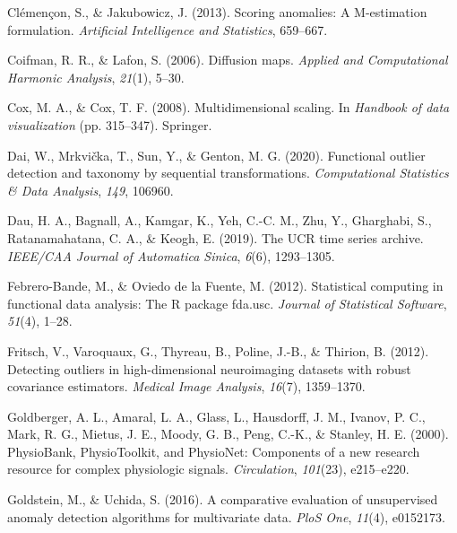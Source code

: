 \documentclass[
  10pt]{article}
\newlength{\cslhangindent}
\newlength{\cslentryspacingunit} %
\newenvironment{CSLReferences}[2] %
 {%
  \setlength{\parindent}{0pt}
  \ifodd #1
  \let\oldpar\par
  \def\par{\hangindent=\cslhangindent\oldpar}
  \fi
  \setlength{\parskip}{#2\cslentryspacingunit}
 }%
 {}
\begin{document}
\begin{CSLReferences}{1}{0}
\leavevmode{}%
Clémençon, S., \& Jakubowicz, J. (2013). Scoring anomalies: A {M}-estimation formulation. \emph{Artificial Intelligence and Statistics}, 659--667.

\leavevmode{}%
Coifman, R. R., \& Lafon, S. (2006). Diffusion maps. \emph{Applied and Computational Harmonic Analysis}, \emph{21}(1), 5--30.

\leavevmode{}%
Cox, M. A., \& Cox, T. F. (2008). Multidimensional scaling. In \emph{Handbook of data visualization} (pp. 315--347). Springer.

\leavevmode{}%
Dai, W., Mrkvička, T., Sun, Y., \& Genton, M. G. (2020). Functional outlier detection and taxonomy by sequential transformations. \emph{Computational Statistics \& Data Analysis}, \emph{149}, 106960.

\leavevmode{}%
Dau, H. A., Bagnall, A., Kamgar, K., Yeh, C.-C. M., Zhu, Y., Gharghabi, S., Ratanamahatana, C. A., \& Keogh, E. (2019). The {UCR} time series archive. \emph{IEEE/CAA Journal of Automatica Sinica}, \emph{6}(6), 1293--1305.

\leavevmode{}%
Febrero-Bande, M., \& Oviedo de la Fuente, M. (2012). Statistical computing in functional data analysis: The {R} package {fda.usc}. \emph{Journal of Statistical Software}, \emph{51}(4), 1--28.

\leavevmode{}%
Fritsch, V., Varoquaux, G., Thyreau, B., Poline, J.-B., \& Thirion, B. (2012). Detecting outliers in high-dimensional neuroimaging datasets with robust covariance estimators. \emph{Medical Image Analysis}, \emph{16}(7), 1359--1370.

\leavevmode{}%
Goldberger, A. L., Amaral, L. A., Glass, L., Hausdorff, J. M., Ivanov, P. C., Mark, R. G., Mietus, J. E., Moody, G. B., Peng, C.-K., \& Stanley, H. E. (2000). Physio{B}ank, {P}hysio{T}oolkit, and {P}hysio{N}et: Components of a new research resource for complex physiologic signals. \emph{Circulation}, \emph{101}(23), e215--e220.

\leavevmode{}%
Goldstein, M., \& Uchida, S. (2016). A comparative evaluation of unsupervised anomaly detection algorithms for multivariate data. \emph{PloS One}, \emph{11}(4), e0152173.


\end{CSLReferences}
\end{document}
